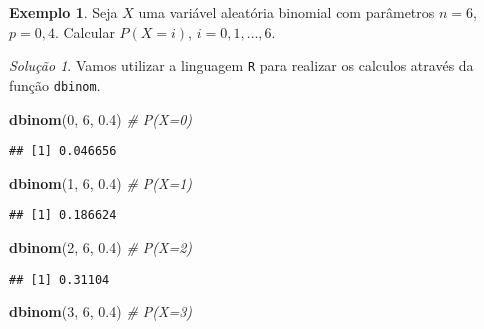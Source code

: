 \documentclass[]{book}
\newenvironment{Shaded}{\begin{snugshade}}{\end{snugshade}}
\newcommand{\CommentTok}[1]{\textcolor[rgb]{0.56,0.35,0.01}{\textit{#1}}}
\newcommand{\DecValTok}[1]{\textcolor[rgb]{0.00,0.00,0.81}{#1}}
\newcommand{\FloatTok}[1]{\textcolor[rgb]{0.00,0.00,0.81}{#1}}
\newcommand{\KeywordTok}[1]{\textcolor[rgb]{0.13,0.29,0.53}{\textbf{#1}}}
\newcommand{\NormalTok}[1]{#1}
\theoremstyle{definition}
\theoremstyle{definition}
\newtheorem{example}{Exemplo}[chapter]
\theoremstyle{definition}
\theoremstyle{remark}
\newtheorem*{solution}{Solução}
\begin{document}
\begin{example}
\protect\hypertarget{exm:unnamed-chunk-187}{}{\label{exm:unnamed-chunk-187} }Seja \(X\) uma variável aleatória binomial com parâmetros \(n = 6\), \(p = 0{,}4\).
Calcular \(P(X=i)\), \(i=0,1,\ldots,6.\)
\end{example}

\begin{solution}
\iffalse{} {Solução. } \fi{}Vamos utilizar a linguagem \texttt{R} para realizar os calculos através da função \texttt{dbinom}.
\end{solution}

\begin{Shaded}
\begin{Highlighting}[]
\KeywordTok{dbinom}\NormalTok{(}\DecValTok{0}\NormalTok{, }\DecValTok{6}\NormalTok{, }\FloatTok{0.4}\NormalTok{) }\CommentTok{# P(X=0)}
\end{Highlighting}
\end{Shaded}

\begin{verbatim}
## [1] 0.046656
\end{verbatim}

\begin{Shaded}
\begin{Highlighting}[]
\KeywordTok{dbinom}\NormalTok{(}\DecValTok{1}\NormalTok{, }\DecValTok{6}\NormalTok{, }\FloatTok{0.4}\NormalTok{) }\CommentTok{# P(X=1)}
\end{Highlighting}
\end{Shaded}

\begin{verbatim}
## [1] 0.186624
\end{verbatim}

\begin{Shaded}
\begin{Highlighting}[]
\KeywordTok{dbinom}\NormalTok{(}\DecValTok{2}\NormalTok{, }\DecValTok{6}\NormalTok{, }\FloatTok{0.4}\NormalTok{) }\CommentTok{# P(X=2)}
\end{Highlighting}
\end{Shaded}

\begin{verbatim}
## [1] 0.31104
\end{verbatim}

\begin{Shaded}
\begin{Highlighting}[]
\KeywordTok{dbinom}\NormalTok{(}\DecValTok{3}\NormalTok{, }\DecValTok{6}\NormalTok{, }\FloatTok{0.4}\NormalTok{) }\CommentTok{# P(X=3)}
\end{Highlighting}
\end{Shaded}
\end{document}

